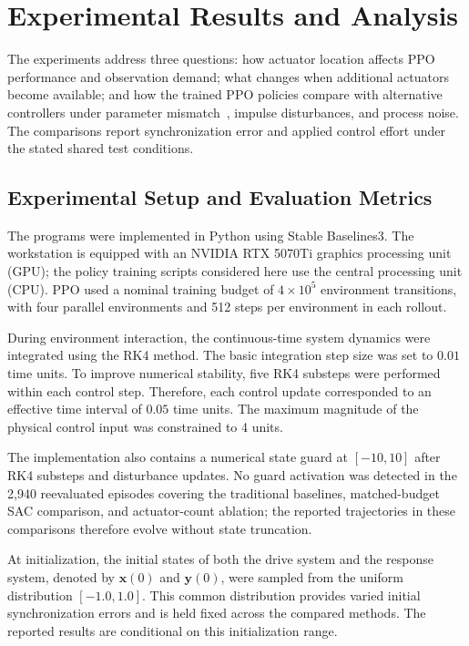 \documentclass[a4paper,fleqn]{cas-dc}
\theoremstyle{plain}
\theoremstyle{definition}
\begin{document}
\section{Experimental Results and Analysis}
\label{sec:experiments}

The experiments address three questions: how actuator location affects PPO performance and observation demand; what changes when additional actuators become available; and how the trained PPO policies compare with alternative controllers under parameter mismatch~\cite{kobiolka2025reducedorder}, impulse disturbances, and process noise. The comparisons report synchronization error and applied control effort under the stated shared test conditions.

\subsection{Experimental Setup and Evaluation Metrics}
\label{subsec:experimental_setup}



The programs were implemented in Python using Stable Baselines3. The workstation is equipped with an NVIDIA RTX 5070Ti graphics processing unit (GPU); the policy training scripts considered here use the central processing unit (CPU). PPO used a nominal training budget of $4\times10^5$ environment transitions, with four parallel environments and 512 steps per environment in each rollout.

During environment interaction, the continuous-time system dynamics were integrated using the RK4 method. The basic integration step size was set to $0.01$ time units. To improve numerical stability, five RK4 substeps were performed within each control step. Therefore, each control update corresponded to an effective time interval of $0.05$ time units. The maximum magnitude of the physical control input was constrained to 4 units.

The implementation also contains a numerical state guard at $[-10,10]$ after RK4 substeps and disturbance updates. No guard activation was detected in the 2,940 reevaluated episodes covering the traditional baselines, matched-budget SAC comparison, and actuator-count ablation; the reported trajectories in these comparisons therefore evolve without state truncation.

At initialization, the initial states of both the drive system and the response system, denoted by $\mathbf{x}(0)$ and $\mathbf{y}(0)$, were sampled from the uniform distribution $[-1.0,1.0]$. This common distribution provides varied initial synchronization errors and is held fixed across the compared methods. The reported results are conditional on this initialization range.
\end{document}
